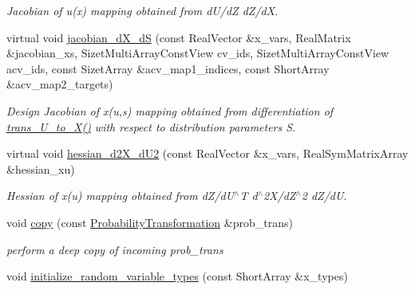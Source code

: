 \begin{DoxyCompactItemize}
\begin{DoxyCompactList}\small\item\em Jacobian of u(x) mapping obtained from d\+U/dZ d\+Z/dX. \end{DoxyCompactList}\item 
virtual void \hyperlink{classPecos_1_1ProbabilityTransformation_ae634a57bc8deb15bb17a9699b5035669}{jacobian\+\_\+d\+X\+\_\+dS} (const Real\+Vector \&x\+\_\+vars, Real\+Matrix \&jacobian\+\_\+xs, Sizet\+Multi\+Array\+Const\+View cv\+\_\+ids, Sizet\+Multi\+Array\+Const\+View acv\+\_\+ids, const Sizet\+Array \&acv\+\_\+map1\+\_\+indices, const Short\+Array \&acv\+\_\+map2\+\_\+targets)\label{classPecos_1_1ProbabilityTransformation_ae634a57bc8deb15bb17a9699b5035669}

\begin{DoxyCompactList}\small\item\em Design Jacobian of x(u,s) mapping obtained from differentiation of \hyperlink{classPecos_1_1ProbabilityTransformation_a0a84860a9ed0cec52ed100edb49f209c}{trans\+\_\+\+U\+\_\+to\+\_\+\+X()} with respect to distribution parameters S. \end{DoxyCompactList}\item 
virtual void \hyperlink{classPecos_1_1ProbabilityTransformation_a6b88718fb820430ebbd87749b27b402a}{hessian\+\_\+d2\+X\+\_\+d\+U2} (const Real\+Vector \&x\+\_\+vars, Real\+Sym\+Matrix\+Array \&hessian\+\_\+xu)\label{classPecos_1_1ProbabilityTransformation_a6b88718fb820430ebbd87749b27b402a}

\begin{DoxyCompactList}\small\item\em Hessian of x(u) mapping obtained from d\+Z/d\+U$^\wedge$T d$^\wedge$2\+X/d\+Z$^\wedge$2 d\+Z/dU. \end{DoxyCompactList}\item 
void \hyperlink{classPecos_1_1ProbabilityTransformation_a2ffaf213ceed0a0ce176b2780a7408f1}{copy} (const \hyperlink{classPecos_1_1ProbabilityTransformation}{Probability\+Transformation} \&prob\+\_\+trans)
\begin{DoxyCompactList}\small\item\em perform a deep copy of incoming prob\+\_\+trans \end{DoxyCompactList}\item 
void \hyperlink{classPecos_1_1ProbabilityTransformation_a8d16ca4265fd8a32882633836fd52149}{initialize\+\_\+random\+\_\+variable\+\_\+types} (const Short\+Array \&x\+\_\+types)\label{classPecos_1_1ProbabilityTransformation_a8d16ca4265fd8a32882633836fd52149}


\end{DoxyCompactItemize}
